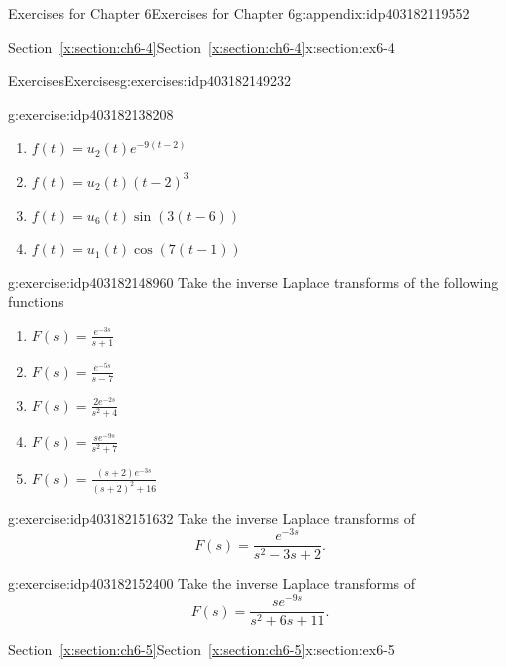 \documentclass[oneside,10pt,]{book}
\newcommand{\xreffont}{\relax}
\numberwithin{equation}{section}
\numberwithin{equation}{section}
\begin{document}
\begin{appendixptx}{Exercises for Chapter 6}{}{Exercises for Chapter 6}{}{}{g:appendix:idp403182119552}
\begin{sectionptx}{Section~{\xreffont\ref*{x:section:ch6-4}}}{}{Section~{\xreffont\ref*{x:section:ch6-4}}}{}{}{x:section:ex6-4}
\begin{exercises-subsection-numberless}{Exercises}{}{Exercises}{}{}{g:exercises:idp403182149232}
\begin{divisionexercise}{1}{}{}{g:exercise:idp403182138208}
\begin{enumerate}[label=(\alph*)]
\item{}\(\displaystyle f(t)=u_{2}(t)e^{-9\left(t-2\right)}\)%
\item{}\(\displaystyle f(t)=u_{2}(t)\left(t-2\right)^{3}\)%
\item{}\(\displaystyle f(t)=u_{6}(t)\sin\left(3\left(t-6\right)\right)\)%
\item{}\(\displaystyle f(t)=u_{1}(t)\cos\left(7\left(t-1\right)\right)\)%
\end{enumerate}
%
\end{divisionexercise}%
\begin{divisionexercise}{2}{}{}{g:exercise:idp403182148960}%
Take the inverse Laplace transforms of the following functions%
\begin{enumerate}[label=(\alph*)]
\item{}\(\displaystyle F(s)=\frac{e^{-3s}}{s+1}\)%
\item{}\(\displaystyle F(s)=\frac{e^{-5s}}{s-7}\)%
\item{}\(\displaystyle F(s)=\frac{2e^{-2s}}{s^{2}+4}\)%
\item{}\(\displaystyle F(s)=\frac{se^{-9s}}{s^{2}+7}\)%
\item{}\(\displaystyle F(s)=\frac{\left(s+2\right)e^{-3s}}{\left(s+2\right)^{2}+16}\)%
\end{enumerate}
%
\end{divisionexercise}%
\begin{divisionexercise}{3}{}{}{g:exercise:idp403182151632}%
Take the inverse Laplace transforms of%
\begin{equation*}
F(s)=\frac{e^{-3s}}{s^{2}-3s+2}.
\end{equation*}
%
\end{divisionexercise}%
\begin{divisionexercise}{4}{}{}{g:exercise:idp403182152400}%
Take the inverse Laplace transforms of%
\begin{equation*}
F(s)=\frac{se^{-9s}}{s^{2}+6s+11}.
\end{equation*}
%
\end{divisionexercise}%
\end{exercises-subsection-numberless}
\end{sectionptx}
%
%
\typeout{************************************************}
\typeout{Section F.5 Section~{\xreffont\ref*{x:section:ch6-5}}}
\typeout{************************************************}
%
\begin{sectionptx}{Section~{\xreffont\ref*{x:section:ch6-5}}}{}{Section~{\xreffont\ref*{x:section:ch6-5}}}{}{}{x:section:ex6-5}

\end{sectionptx}
\end{appendixptx}
\end{document}
